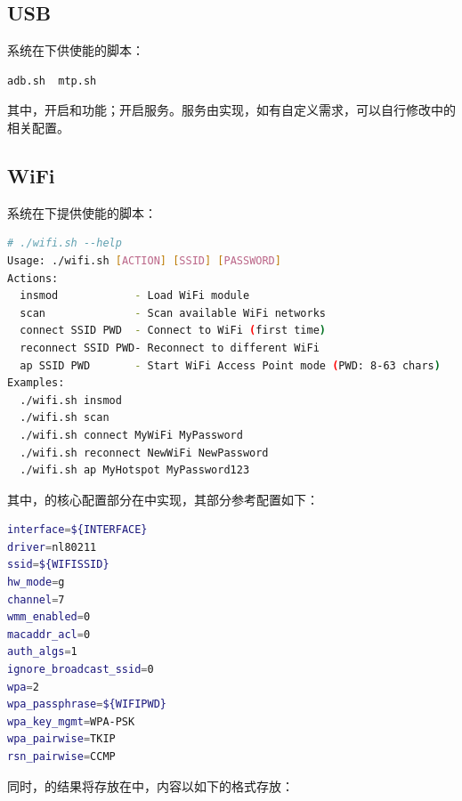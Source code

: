 \documentclass[UTF8]{ctexart}
\begin{document}

\subsection{USB}

系统在下供使能的脚本：

\begin{lstlisting}[language=sh]
adb.sh  mtp.sh    
\end{lstlisting}

\noindent 其中，开启和功能；开启服务。服务由实现，如有自定义需求，可以自行修改中的相关配置。


\subsection{WiFi}

系统在下提供使能的脚本：

\begin{lstlisting}[language=sh]
# ./wifi.sh --help
Usage: ./wifi.sh [ACTION] [SSID] [PASSWORD]
Actions:
  insmod            - Load WiFi module
  scan              - Scan available WiFi networks
  connect SSID PWD  - Connect to WiFi (first time)
  reconnect SSID PWD- Reconnect to different WiFi
  ap SSID PWD       - Start WiFi Access Point mode (PWD: 8-63 chars)
Examples:
  ./wifi.sh insmod
  ./wifi.sh scan
  ./wifi.sh connect MyWiFi MyPassword
  ./wifi.sh reconnect NewWiFi NewPassword
  ./wifi.sh ap MyHotspot MyPassword123
\end{lstlisting}

\noindent 其中，的核心配置部分在中实现，其部分参考配置如下：

\begin{lstlisting}[language=sh]
interface=${INTERFACE}
driver=nl80211
ssid=${WIFISSID}
hw_mode=g
channel=7
wmm_enabled=0
macaddr_acl=0
auth_algs=1
ignore_broadcast_ssid=0
wpa=2
wpa_passphrase=${WIFIPWD}
wpa_key_mgmt=WPA-PSK
wpa_pairwise=TKIP
rsn_pairwise=CCMP
\end{lstlisting}

同时，的结果将存放在中，内容以如下的格式存放：
\end{document}
